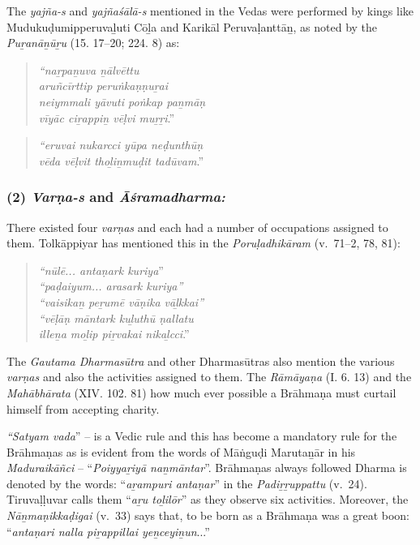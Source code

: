 The \textit{yajña-s} and \textit{yajñaśālā-s} mentioned in the Vedas were performed by kings like Mudukuḍumipperuvaḻuti Cōḻa and Karikāl Peruvaḷanttāṉ, as noted by the \textit{Puṟanāṉūṟu} (15. 17–20; 224. 8) as:

\begin{quote}
\textit{“naṟpaṉuva ṉālvēttu}\\\textit{aruñcīrttip peruṅkaṇṇuṟai}\\\textit{neiymmali yāvuti poṅkap paṉmāṇ}\\\textit{vīyāc ciṟappiṉ vēḷvi muṟṟi}.”
\end{quote}

\begin{quote}
\textit{“eruvai nukarcci yūpa neḍunthūṇ}\\\textit{vēda vēḷvit thoḻiṉmuḍit tadūvam}.”
\end{quote}


\subsubsection*{(2) \textit{Varṇa-s} and \textit{Āśramadharma:}}

\vskip -7pt

There existed four \textit{varṇas} and each had a number of occupations assigned to them. Tolkāppiyar has mentioned this in the \textit{Poruḷadhikāram} (v.~71–2, 78, 81):

\begin{quote}
\textit{“nūlē... antaṇark kuriya}”\\\textit{“paḍaiyum... arasark kuriya”}\\\textit{“vaisikaṉ peṟumē vāṇika vāḻkkai”}\\\textit{“vēḷāṇ māntark kuḻuthū ṇallatu}\\\textit{illeṉa moḻip piṟvakai nikaḻcci}.”
\end{quote}

The \textit{Gautama Dharmasūtra} and other Dharmasūtras also mention the various \textit{varṇas} and also the activities assigned to them. The \textit{Rāmāyaṇa} (I. 6. 13) and the \textit{Mahābhārata} (XIV. 102. 81) how much ever possible a Brāhmaṇa must curtail himself from accepting charity.

\textit{“Satyam vada}” – is a Vedic rule and this has become a mandatory rule for the Brāhmaṇas as is evident from the words of Māṅguḍi Marutaṉār in his \textit{Maduraikāñci} – “\textit{Poiyyaṟiyā naṉmāntar}”. Brāhmaṇas always followed Dharma is denoted by the words: “\textit{aṟampuri antaṇar}” in the \textit{Padiṟṟuppattu} (v.~24). Tiruvaḷḷuvar calls them “\textit{aṟu toḻilōr}” as they observe six activities. Moreover, the \textit{Nāṉmaṇikkaḍigai} (v.~33) says that, to be born as a Brāhmaṇa was a great boon: “\textit{antaṇari nalla piṟappillai yeṉceyiṉun}...”

